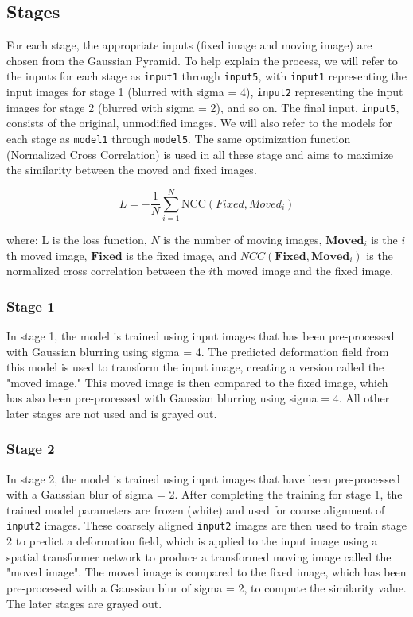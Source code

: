 \documentclass{report}
\begin{document}
	\subsection{Stages}
	For each stage, the appropriate inputs (fixed image and moving image) are chosen from the Gaussian Pyramid. To help explain the process, we will refer to the inputs for each stage as \texttt{input1} through \texttt{input5}, with \texttt{input1} representing the input images for stage 1 (blurred with sigma = 4), \texttt{input2} representing the input images for stage 2 (blurred with sigma = 2), and so on. The final input, \texttt{input5}, consists of the original, unmodified images. We will also refer to the models for each stage as \texttt{model1} through \texttt{model5}. The same optimization function (Normalized Cross Correlation) is used in all these stage and aims to maximize the similarity between the moved and fixed images.
	
	\begin{equation}
		L = -\frac{1}{N} \sum_{i=1}^N \text{NCC}(Fixed, Moved_i)
	\end{equation}
	
	where:
		$\text{L}$ is the loss function, $N$ is the number of moving images, $\mathbf{Moved}_i$ is the $i$th moved image, $\mathbf{Fixed}$ is the fixed image, and $NCC(\mathbf{Fixed}, \mathbf{Moved}_i)$ is the normalized cross correlation between the $i$th moved image and the fixed image.
	
	\subsubsection{Stage 1}
	In stage 1, the model is trained using input images that has been pre-processed with Gaussian blurring using sigma = 4. The predicted deformation field from this model is used to transform the input image, creating a version called the "moved image." This moved image is then compared to the fixed image, which has also been pre-processed with Gaussian blurring using sigma = 4. All other later stages are not used and is grayed out.
	
	\subsubsection{Stage 2}
	In stage 2, the model is trained using input images that have been pre-processed with a Gaussian blur of sigma = 2. After completing the training for stage 1, the trained model parameters are frozen (white) and used for coarse alignment of \texttt{input2} images. These coarsely aligned \texttt{input2} images are then used to train stage 2 to predict a deformation field, which is applied to the input image using a spatial transformer network to produce a transformed moving image called the "moved image". The moved image is compared to the fixed image, which has been pre-processed with a Gaussian blur of sigma = 2, to compute the similarity value. The later stages are grayed out.
	
\end{document}
